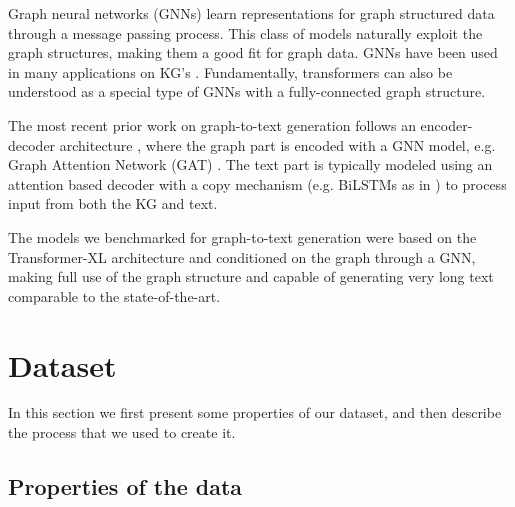 \documentclass[11pt]{article}
\begin{document}
Graph neural networks (GNNs) \cite{battaglia2018relational,gilmer2017neural} learn representations for graph structured data through a message passing process. This class of models naturally exploit the graph structures, 
making them a good fit for graph data.  GNNs have been used in many applications on 
KG's \cite{kipf2016semi,wang2019knowledge,xu2019cross}.  Fundamentally, transformers can also be understood as a special type of GNNs with a fully-connected graph structure.



The most recent prior work on graph-to-text generation
follows an encoder-decoder architecture \cite{koncel-kedziorski-etal-2019-text, jin-etal-2020-genwiki}, where the graph part is encoded with a GNN model, e.g. 
Graph Attention Network (GAT) \cite{velickovic2018graph}.
The text part is typically modeled using an attention based decoder with a copy mechanism (e.g. BiLSTMs as in \cite{jin-etal-2020-genwiki}) to process input from both the KG and text.


The models we benchmarked for graph-to-text generation were based on the Transformer-XL architecture and conditioned on the graph through a GNN, making full use of the graph structure and capable of generating very long text comparable to the state-of-the-art.
































\section{Dataset}

In this section we first present some properties of our dataset, and then describe the process that we used to create it.

\subsection{Properties of the data}
\end{document}
